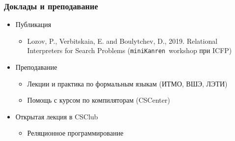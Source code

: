 \documentclass{beamer}
\newcommand{\miniKanren}{\texttt{miniKanren}}
\begin{document}
\begin{frame}[fragile]
  \transwipe[direction=90]
  \frametitle{Доклады и преподавание}
  \begin{itemize}
    \item Публикация
    \begin{itemize}
      \item Lozov, P., Verbitskaia, E. and Boulytchev, D., 2019. Relational Interpreters for Search Problems (\miniKanren \ workshop при ICFP)
    \end{itemize} 
    \item Преподавание
    \begin{itemize}
      \item Лекции и практика по формальным языкам (ИТМО, ВШЭ, ЛЭТИ)
      \item Помощь с курсом по компиляторам (CSCenter)
    \end{itemize} 
    \item Открытая лекция в CSClub
    \begin{itemize}
      \item Реляционное программирование
    \end{itemize}
  \end{itemize}


\end{frame}
\end{document}
